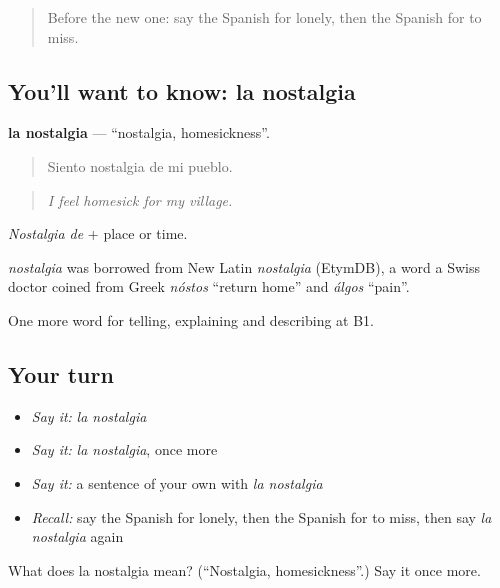 \begin{quote}
Before the new one: say the Spanish for lonely, then the Spanish for to miss.
\end{quote}

\subsection*{You'll want to know: la nostalgia}
\textbf{la nostalgia} — \textquotedblleft{}nostalgia, homesickness\textquotedblright{}.

\begin{quote}
Siento nostalgia de mi pueblo.
\end{quote}

\begin{quote}
\emph{I feel homesick for my village.}
\end{quote}

\emph{Nostalgia de} + place or time.

\begin{cousinweb}
\emph{nostalgia} was borrowed from New Latin \emph{nostalgia} (EtymDB), a word a Swiss doctor coined from Greek \emph{nóstos} \textquotedblleft{}return home\textquotedblright{} and \emph{álgos} \textquotedblleft{}pain\textquotedblright{}.
\end{cousinweb}

\begin{grammarlens}[title={What you've built}]
One more word for telling, explaining and describing at B1.
\end{grammarlens}

\subsection*{Your turn}
\begin{itemize}
\raggedright
  \item \emph{Say it:} \emph{la nostalgia}
  \item \emph{Say it:} \emph{la nostalgia}, once more
  \item \emph{Say it:} a sentence of your own with \emph{la nostalgia}
  \item \emph{Recall:} say the Spanish for lonely, then the Spanish for to miss, then say \emph{la nostalgia} again
\end{itemize}

\begin{tcolorbox}[breakable,colback=teal!4,colframe=teal!35!black,title={Before you move on}]
What does la nostalgia mean? (\textquotedblleft{}Nostalgia, homesickness\textquotedblright{}.) Say it once more.
\end{tcolorbox}
